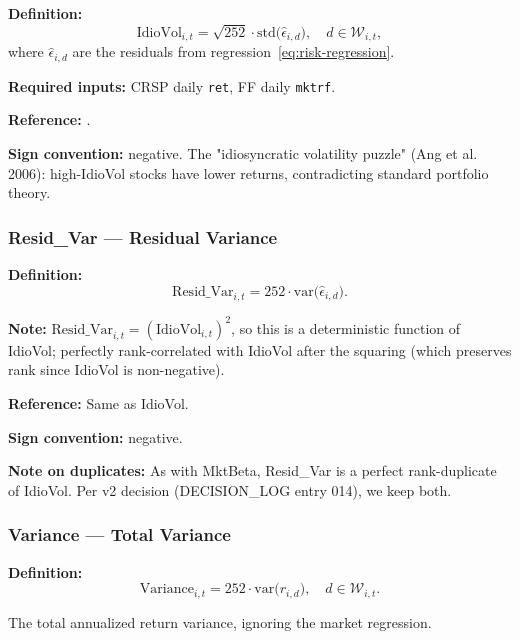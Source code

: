 \textbf{Definition:}
\begin{equation}
\mathrm{IdioVol}_{i,t} = \sqrt{252} \cdot
\mathrm{std}\bigl(\widehat{\epsilon}_{i,d}\bigr),
\quad d \in \mathcal{W}_{i,t},
\label{eq:idiovol}
\end{equation}
where $\widehat{\epsilon}_{i,d}$ are the residuals from
regression~\eqref{eq:risk-regression}.

\textbf{Required inputs:} CRSP daily \texttt{ret}, FF daily
\texttt{mktrf}.

\textbf{Reference:} \cite{AngHodrickXing2006}.

\textbf{Sign convention:} negative. The "idiosyncratic volatility
puzzle" (Ang et al. 2006): high-IdioVol stocks have lower returns,
contradicting standard portfolio theory.

\subsubsection{Resid\_Var --- Residual Variance}

\textbf{Definition:}
\begin{equation}
\mathrm{Resid\_Var}_{i,t} = 252 \cdot \mathrm{var}\bigl(\widehat{\epsilon}_{i,d}\bigr).
\label{eq:resid-var}
\end{equation}

\textbf{Note:} $\mathrm{Resid\_Var}_{i,t} = (\mathrm{IdioVol}_{i,t})^2$,
so this is a deterministic function of IdioVol; perfectly rank-correlated
with IdioVol after the squaring (which preserves rank since IdioVol is
non-negative).

\textbf{Reference:} Same as IdioVol.

\textbf{Sign convention:} negative.

\textbf{Note on duplicates:} As with MktBeta, Resid\_Var is a perfect
rank-duplicate of IdioVol. Per v2 decision (DECISION\_LOG entry 014),
we keep both.

\subsubsection{Variance --- Total Variance}

\textbf{Definition:}
\begin{equation}
\mathrm{Variance}_{i,t} = 252 \cdot \mathrm{var}\bigl(r_{i,d}\bigr),
\quad d \in \mathcal{W}_{i,t}.
\label{eq:variance}
\end{equation}

The total annualized return variance, ignoring the market regression.

